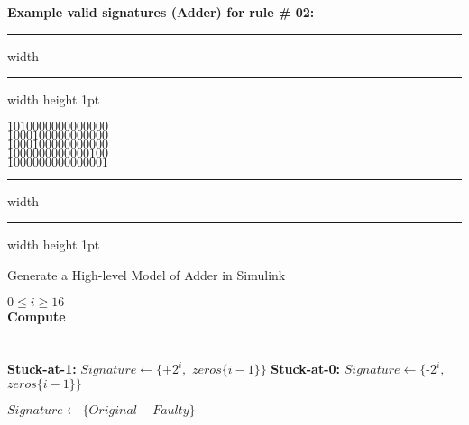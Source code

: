 \hspace{-0.3 cm}\textbf{Example valid signatures (Adder) for rule \# 02:}
\hrule height 2pt width \hsize \kern 1pt \hrule width \hsize height 1pt
\begin{center}
$1010 0000 0000 0000$ \\
$1000 1000 0000 0000$ \\
$1000 1000 0000 0000$ \\
$1000 0000 0000 0100$ \\
$1000 0000 0000 0001$ \\
\end{center}
\hrule height 2pt width \hsize \kern 1pt \hrule width \hsize height 1pt
\begin{algorithm}
\caption{Generate a High-level Model of  Adder in Simulink}
\begin{algorithmic}
\label{algo-adder}
\REQUIRE $0\leq i \geq16$ \\
\textbf{Compute}\\ 
\hspace{1.5cm}{$Original =  A $ $ $+$ $ $ B$ } \\
\hspace{1.5cm}{$Faulty =  A $ $ $+$ $ $ B$ } \\
\vspace{0.20 cm }
\textbf{Stuck-at-1:}
\vspace{0.20 cm }
\vspace{0.10 cm }
\STATE $Signature \leftarrow  \{$+$ 2^{i},$ $ $$zeros$$\{i-1\}\}$
\vspace{0.10 cm }
\ENDIF
\vspace{0.20 cm }
\textbf{Stuck-at-0:}
\vspace{0.20 cm }
\vspace{0.10 cm }
\STATE $Signature \leftarrow  \{$-$ 2^{i},$ $ $$zeros$$\{i-1\}\}$
\vspace{0.10 cm }
\ENDIF

\vspace{0.20 cm }
\vspace{0.20 cm }
\vspace{0.10 cm }
\STATE $Signature \leftarrow  \{$$Original-Faulty$$\}$
\vspace{0.10 cm }
\ENDIF

\end{algorithmic}
\end{algorithm}



